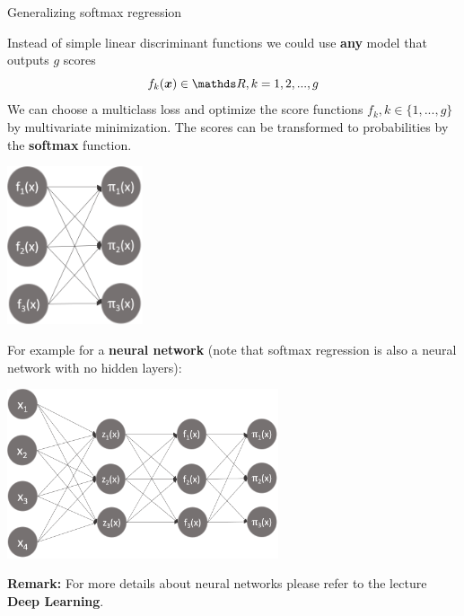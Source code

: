 \begin{vbframe}{Generalizing softmax regression} 

Instead of simple linear discriminant functions we could use \textbf{any} model that outputs $g$ scores 
$$
  f_k(\xv) \in \R, k = 1, 2, ..., g
$$
We can choose a multiclass loss and optimize the score functions $f_k, k \in \{1, ..., g\}$ by multivariate minimization. 
The scores can be transformed to probabilities by the \textbf{softmax} function.

\begin{center}
  \includegraphics[width=0.3\textwidth]{figure_man/score_model.png}
\end{center}

\framebreak 

For example for a \textbf{neural network} (note that softmax regression is also a neural network with no hidden layers):

\begin{center}
  \includegraphics[width=0.6\textwidth]{figure_man/neural_net.png}
\end{center}

\textbf{Remark:} For more details about neural networks please refer to the lecture \textbf{Deep Learning}. 


\end{vbframe}


\endlecture
